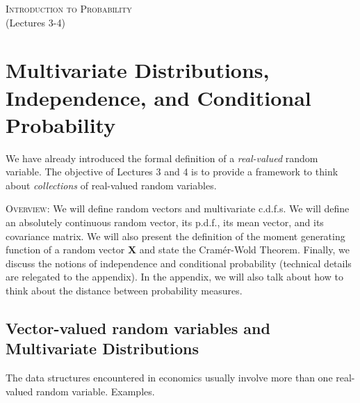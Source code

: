 \documentclass[11pt]{article} %
\begin{document}
\onehalfspace


\vspace*{\fill}
\begingroup
\centering

\Large {\scshape Introduction to Probability}\\

(Lectures 3-4)

\endgroup
\vspace*{\fill}


\newpage





\section{Multivariate Distributions, Independence, and Conditional Probability}
We have already introduced the formal definition of a \emph{real-valued} random variable. The objective of Lectures 3 and 4 is to provide a framework to think about \emph{collections} of real-valued random variables. 

{\scshape Overview:} We will define random vectors and multivariate c.d.f.s. We will define an absolutely continuous random vector, its p.d.f., its mean vector, and its covariance matrix. We will also present the definition of the moment generating function of a random vector $\mathbf{X}$ and state the Cram\'er-Wold Theorem. Finally, we discuss the notions of independence and conditional probability (technical details are relegated to the appendix). In the appendix, we will also talk about how to think about the distance between probability measures.

\subsection{Vector-valued random variables and Multivariate Distributions}
The data structures encountered in economics usually involve more than one real-valued random variable. Examples.
\end{document}
